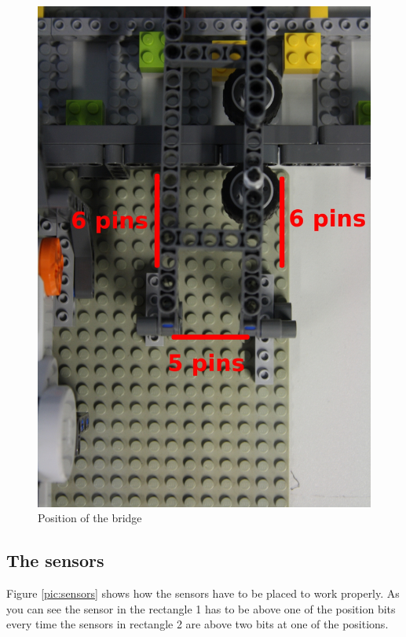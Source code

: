 \documentclass[%
  a4paper,%
  11pt,%
  blue,%
  hyperref	%
  ]{tubsartcl}
\begin{document}
\begin{figure}[!htb]
\begin{center}
\includegraphics[scale=0.35]{graphics_lego/bridge1.jpg}
\end{center}
\caption{Position of the bridge}
\label{pic:bridge1}
\end{figure}

\clearpage

\subsection{The sensors}

Figure \ref{pic:sensors} shows how the sensors have to be placed to work properly. As you can see the sensor in the rectangle 1 has to be above one of the position bits every time the sensors in rectangle 2 are above two bits at one of the positions.
\end{document}
